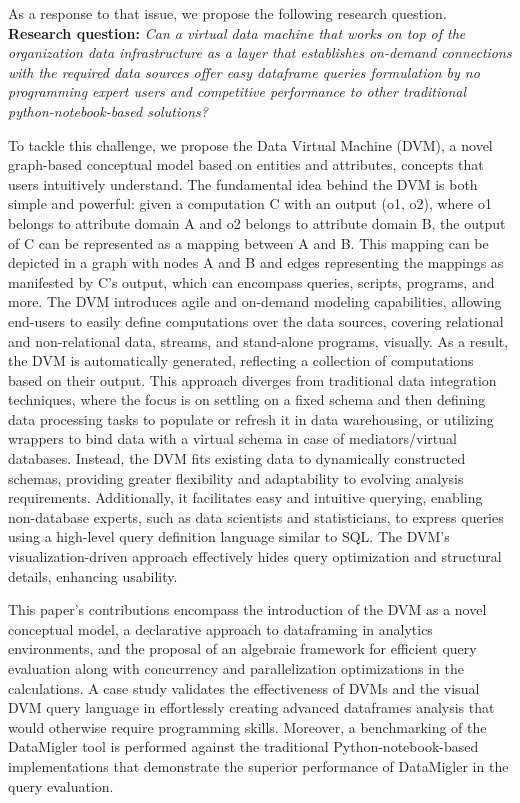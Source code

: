 As a response to that issue, we propose the following research question.
\textbf{Research question:} \textit{Can a virtual data machine that works on top of the organization data infrastructure as a layer that establishes on-demand connections with the required data sources offer easy dataframe queries formulation by no programming expert users and competitive performance to other traditional python-notebook-based solutions?}

To tackle this challenge, we propose the Data Virtual Machine (DVM), a novel graph-based conceptual model based on entities and attributes, concepts that users intuitively understand. The fundamental idea behind the DVM is both simple and powerful: given a computation C with an output (o1, o2), where o1 belongs to attribute domain A and o2 belongs to attribute domain B, the output of C can be represented as a mapping between A and B. This mapping can be depicted in a graph with nodes A and B and edges representing the mappings as manifested by C's output, which can encompass queries, scripts, programs, and more. The DVM introduces agile and on-demand modeling capabilities, allowing end-users to easily define computations over the data sources, covering relational and non-relational data, streams, and stand-alone programs, visually. As a result, the DVM is automatically generated, reflecting a collection of computations based on their output. This approach diverges from traditional data integration techniques, where the focus is on settling on a fixed schema and then defining data processing tasks to populate or refresh it in data warehousing, or utilizing wrappers to bind data with a virtual schema in case of mediators/virtual databases. Instead, the DVM fits existing data to dynamically constructed schemas, providing greater flexibility and adaptability to evolving analysis requirements. Additionally, it facilitates easy and intuitive querying, enabling non-database experts, such as data scientists and statisticians, to express queries using a high-level query definition language similar to SQL. The DVM's visualization-driven approach effectively hides query optimization and structural details, enhancing usability.

This paper's contributions encompass the introduction of the DVM as a novel conceptual model, a declarative approach to dataframing in analytics environments, and the proposal of an algebraic framework for efficient query evaluation along with concurrency and parallelization optimizations in the calculations. A case study validates the effectiveness of DVMs and the visual DVM query language in effortlessly creating advanced dataframes analysis that would otherwise require programming skills. Moreover, a benchmarking of the DataMigler tool is performed against the traditional Python-notebook-based implementations that demonstrate the superior performance of DataMigler in the query evaluation.

